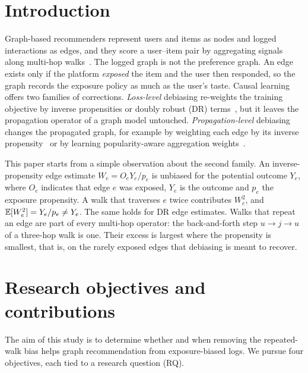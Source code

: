\section{Introduction}

Graph-based recommenders represent users and items as nodes and logged
interactions as edges, and they score a user--item pair by aggregating signals
along multi-hop walks~\citep{he2020lightgcn,shen2021gfcf}. The logged graph is
not the preference graph. An edge exists only if the platform \emph{exposed}
the item and the user then responded, so the graph records the exposure policy
as much as the user's taste. Causal learning offers two families of
corrections. \emph{Loss-level} debiasing re-weights the training objective by
inverse propensities or doubly robust (DR)
terms~\citep{schnabel2016,wang2019drjl,saito2020unbiased}, but it leaves the
propagation operator of a graph model untouched. \emph{Propagation-level}
debiasing changes the propagated graph, for example by weighting each edge by
its inverse propensity~\citep{kim2022navip} or by learning popularity-aware
aggregation weights~\citep{zhou2023apda,dpaa2026}.

This paper starts from a simple observation about the second family. An
inverse-propensity edge estimate $W_e=O_eY_e/p_e$ is unbiased for the potential
outcome $Y_e$, where $O_e$ indicates that edge $e$ was exposed, $Y_e$ is the
outcome and $p_e$ the exposure propensity. A walk that traverses $e$ twice
contributes $W_e^2$, and $\mathbb{E}[W_e^2]=Y_e/p_e\neq Y_e$. The same holds for DR edge
estimates. Walks that repeat an edge are part of every multi-hop operator: the
back-and-forth step $u\to j\to u$ of a three-hop walk is one. Their excess is
largest where the propensity is smallest, that is, on the rarely exposed edges
that debiasing is meant to recover.

\section{Research objectives and contributions}\label{sec:objectives}

The aim of this study is to determine whether and when removing the
repeated-walk bias helps graph recommendation from exposure-biased logs. We
pursue four objectives, each tied to a research question (RQ).

